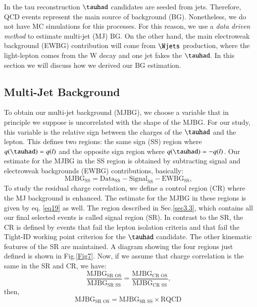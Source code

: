 In the tau reconstruction $\tauhad$ candidates are seeded from jets. Therefore, QCD events represent the main source of background (BG). Nonetheless, we do not have MC simulations for this processes. For this reason, we use a \textit{data driven method} to estimate multi-jet (MJ) BG. On the other hand, the main electroweak background (EWBG) contribution will come from $\Wjets$ production, where the light-lepton comes from the W decay and one jet fakes the $\tauhad$. In this section we will discuss how we derived our BG estimation.

\subsection{Multi-Jet Background}
To obtain our multi-jet background (MJBG), we choose a variable that in principle we suppose is uncorrelated with the shape of the MJBG. For our study, this variable is the relative sign between the charges of the $\tauhad$ and the lepton. This defines two regions: the same sign (SS) region where $q(\tauhad)=q(l)$ and the opposite sign region where $q(\tauhad)=-q(l)$. Our estimate for the MJBG in the SS region is obtained by subtracting signal and electroweak backgrounds (EWBG) contributions, basically:
\begin{equation}
\text{MJBG}_{\text{SS}}=\text{Data}_{\text{SS}}-\text{Signal}_{\text{SS}}-\text{EWBG}_{\text{SS}},
\label{eq19}
\end{equation}
 To study the residual charge correlation, we define a control region (CR) where the MJ background is enhanced. The estimate for the MJBG in these regions is given by eq. \ref{eq19} as well. The region described in Sec.\ref{sec3.3}, which contains all our final selected events is called signal region (SR). In contrast to the SR, the CR is defined by events that fail the lepton isolation criteria and that fail the Tight-ID working point criterion for the $\tauhad$ candidate. The other kinematic features of the SR are maintained. A diagram showing the four regions just defined is shown in Fig.\ref{Fig7}. Now, if we assume that charge correlation is the same in the SR and CR, we have:
 \begin{equation}
 \frac{\text{MJBG}_{\text{SR OS}}}{\text{MJBG}_{\text{SR SS}}}=\frac{\text{MJBG}_{\text{CR OS}}}{\text{MJBG}_{\text{CR SS}}},
 \end{equation}
then,
 \begin{equation}
\text{MJBG}_{\text{SR OS}}=\text{MJBG}_{\text{SR SS}}\times \text{RQCD}\,
\label{eq36}
\end{equation}

